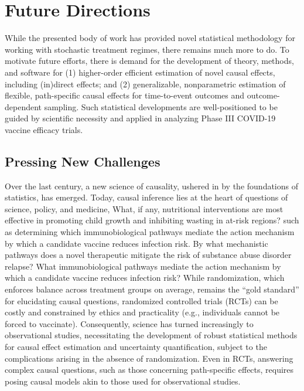\chapter{Future Directions}\label{six}

While the presented body of work has provided novel statistical methodology for
working with stochastic treatment regimes, there remains much more to do. To
motivate future efforts, there is demand for the development of theory, methods,
and software for (1) higher-order efficient estimation of novel causal effects,
including (in)direct effects; and (2) generalizable, nonparametric estimation of
flexible, path-specific causal effects for time-to-event outcomes and
outcome-dependent sampling. Such statistical developments are well-positioned to
be guided by scientific necessity and applied in analyzing Phase III COVID-19
vaccine efficacy trials.

\section{Pressing New Challenges}

Over the last century, a new science of causality, ushered in by the foundations
of statistics, has emerged. Today, causal inference lies at the heart of
questions of science, policy, and medicine, What, if any, nutritional
interventions are most effective in promoting child growth and inhibiting
wasting in at-risk regions? such as determining which immunobiological pathways
mediate the action mechanism by which a candidate vaccine reduces infection
risk. By what mechanistic pathways does a novel therapeutic mitigate the risk of
substance abuse disorder relapse? What immunobiological pathways mediate the
action mechanism by which a candidate vaccine reduces infection risk? While
randomization, which enforces balance across treatment groups on average,
remains the ``gold standard'' for elucidating causal questions, randomized
controlled trials (RCTs) can be costly and constrained by ethics and
practicality (e.g., individuals cannot be forced to vaccinate). Consequently,
science has turned increasingly to observational studies, necessitating the
development of robust statistical methods for causal effect estimation and
uncertainty quantification, subject to the complications arising in the absence
of randomization. Even in RCTs, answering complex causal questions, such as
those concerning path-specific effects, requires posing causal models akin to
those used for observational studies.

